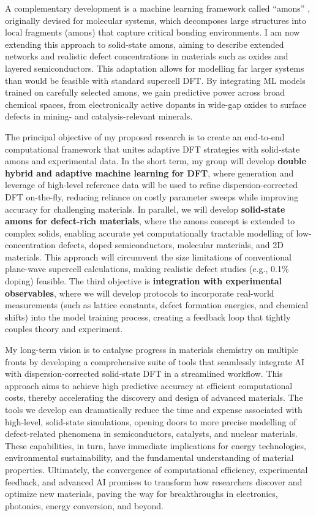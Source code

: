 \documentclass[11pt,english,calcwidth,compact]{nserc-appendix}
\begin{document}
A complementary development is a machine learning framework called “amons” \cite{amons}, originally devised for molecular systems, which decomposes large structures into local fragments (amons) that capture critical bonding environments. I am now extending this approach to solid-state amons, aiming to describe extended networks and realistic defect concentrations in materials such as oxides and layered semiconductors. This adaptation allows for modelling far larger systems than would be feasible with standard supercell DFT. By integrating ML models trained on carefully selected amons, we gain predictive power across broad chemical spaces, from electronically active dopants in wide-gap oxides to surface defects in mining- and catalysis-relevant minerals.

The principal objective of my proposed research is to create an end-to-end computational framework that unites adaptive DFT strategies with solid-state amons and experimental data. In the short term, my group will develop \textbf{double hybrid and adaptive machine learning for DFT}, where generation and leverage of high-level reference data will be used to refine dispersion-corrected DFT on-the-fly, reducing reliance on costly parameter sweeps while improving accuracy for challenging materials. In parallel, we will develop \textbf{solid-state amons for defect-rich materials}, where the amons concept is extended to complex solids, enabling accurate yet computationally tractable modelling of low-concentration defects, doped semiconductors, molecular materials, and 2D materials. This approach will circumvent the size limitations of conventional plane-wave supercell calculations, making realistic defect studies (e.g., 0.1\% doping) feasible. The third objective is \textbf{integration with experimental observables}, where we will develop protocols to incorporate real-world measurements (such as lattice constants, defect formation energies, and chemical shifts) into the model training process, creating a feedback loop that tightly couples theory and experiment.

My long-term vision is to  catalyse progress in materials chemistry on multiple fronts by developing a comprehensive suite of tools that seamlessly integrate AI with dispersion-corrected solid-state DFT in a streamlined workflow. This approach aims to achieve high predictive accuracy at efficient computational costs, thereby accelerating the discovery and design of advanced materials. 
The tools we develop can dramatically reduce the time and expense associated with high-level, solid-state simulations, opening doors to more precise modelling of defect-related phenomena in semiconductors, catalysts, and nuclear materials. These capabilities, in turn, have immediate implications for energy technologies, environmental sustainability, and the fundamental understanding of material properties. Ultimately, the convergence of computational efficiency, experimental feedback, and advanced AI promises to transform how researchers discover and optimize new materials, paving the way for breakthroughs in electronics, photonics, energy conversion, and beyond.
\end{document}

